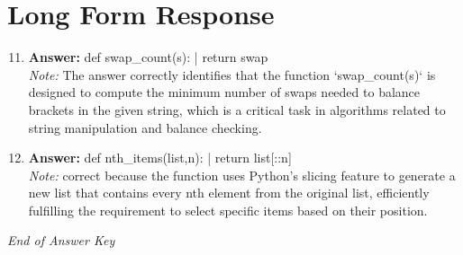 \documentclass[12pt]{article}
\begin{document}
\section*{Long Form Response}
\begin{enumerate}[label=\arabic*.]
\setcounter{enumi}{10}
\item \textbf{Answer:} def swap\_count(s): | return swap
\\ \textit{Note:} The answer correctly identifies that the function `swap\_count(s)` is designed to compute the minimum number of swaps needed to balance brackets in the given string, which is a critical task in algorithms related to string manipulation and balance checking.
\item \textbf{Answer:} def nth\_items(list,n): | return list[::n]
\\ \textit{Note:} correct because the function uses Python's slicing feature to generate a new list that contains every nth element from the original list, efficiently fulfilling the requirement to select specific items based on their position.
\end{enumerate}

\vfill
\noindent\textit{End of Answer Key}
\end{document}
